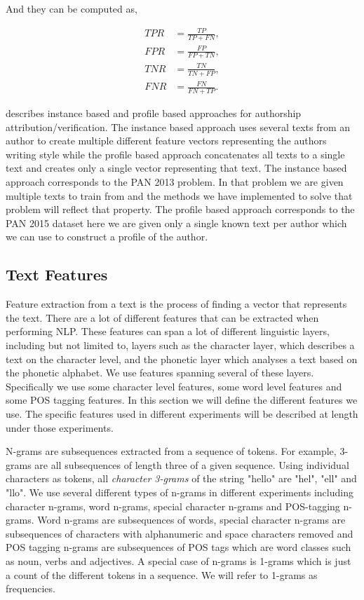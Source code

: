 And they can be computed as,

\begin{align}
    TPR &= \frac{TP}{TP + FN}, \\
    FPR &= \frac{FP}{FP + TN}, \\
    TNR &= \frac{TN}{TN + FP}, \\
    FNR &= \frac{FN}{FN + TP}.
\end{align}

\cite{stamatos2009} describes instance based and profile based approaches for
authorship attribution/verification. The instance based approach uses several
texts from an author to create multiple different feature vectors representing
the authors writing style while the profile based approach concatenates all
texts to a single text and creates only a single vector representing that text.
The instance based approach corresponds to the PAN 2013 problem. In that problem
we are given multiple texts to train from and the methods we have implemented to
solve that problem will reflect that property. The profile based approach
corresponds to the PAN 2015 dataset here we are given only a single known text
per author which we can use to construct a profile of the author.

\subsection{Text Features} \label{subsec:method:text_features} Feature
extraction from a text is the process of finding a vector that represents
the text. There are a lot of different features that can be extracted when
performing \gls{NLP}. These features can span a lot of different linguistic
layers, including but not limited to, layers such as the character layer, which
describes a text on the character level, and the phonetic layer which analyses a
text based on the phonetic alphabet. We use features spanning several of these
layers. Specifically we use some character level features, some word level
features and some \gls{POS} tagging features. In this section we will define the
different features we use. The specific features used in different experiments
will be described at length under those experiments.

N-grams are subsequences extracted from a sequence of tokens. For example,
3-grams are all subsequences of length three of a given sequence. Using
individual characters as tokens, all \textit{character 3-grams} of the string
"hello" are "hel", "ell" and "llo". We use several different types of n-grams
in different experiments including character n-grams, word n-grams, special
character n-grams and \gls{POS}-tagging n-grams. Word n-grams are subsequences
of words, special character n-grams are subsequences of characters with
alphanumeric and space characters removed and \gls{POS} tagging n-grams are
subsequences of \gls{POS} tags which are word classes such as noun, verbs and
adjectives. A special case of n-grams is 1-grams which is just a count of the
different tokens in a sequence. We will refer to 1-grams as frequencies.

